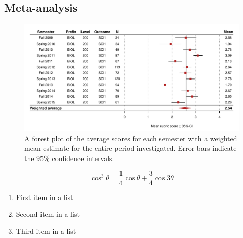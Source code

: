 \documentclass[fleqn,10pt]{SelfArx}\usepackage[]{graphicx}\usepackage[]{color}
\begin{document}
\lipsum[1]
\subsection{Meta-analysis}
\begin{figure}[ht]\centering %

\includegraphics[width=\textwidth]{./figure/forest}
\protect\caption{A forest plot of the average scores for each semester with a weighted mean estimate for the entire period investigated. Error bars indicate the 95\% confidence intervals.}
\label{fig:forest.pdf}
\end{figure}

\lipsum[1] %
\lipsum[1]

\begin{equation}
\cos^3 \theta =\frac{1}{4}\cos\theta+\frac{3}{4}\cos 3\theta
\label{eq:refname2}
\end{equation}

\lipsum[1] %

\begin{enumerate}[noitemsep] %
\item First item in a list
\item Second item in a list
\item Third item in a list
\end{enumerate}
\end{document}
